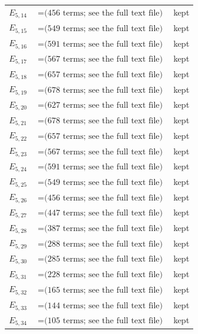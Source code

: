 \documentclass[10pt]{article}
\begin{document}
\begin{longtable}{r>{\raggedright\arraybackslash}p{}>{\raggedright\arraybackslash}p{}}
$E_{5,14}$ & $= \text{(456 terms; see the full text file)}$ & kept \\
$E_{5,15}$ & $= \text{(549 terms; see the full text file)}$ & kept \\
$E_{5,16}$ & $= \text{(591 terms; see the full text file)}$ & kept \\
$E_{5,17}$ & $= \text{(567 terms; see the full text file)}$ & kept \\
$E_{5,18}$ & $= \text{(657 terms; see the full text file)}$ & kept \\
$E_{5,19}$ & $= \text{(678 terms; see the full text file)}$ & kept \\
$E_{5,20}$ & $= \text{(627 terms; see the full text file)}$ & kept \\
$E_{5,21}$ & $= \text{(678 terms; see the full text file)}$ & kept \\
$E_{5,22}$ & $= \text{(657 terms; see the full text file)}$ & kept \\
$E_{5,23}$ & $= \text{(567 terms; see the full text file)}$ & kept \\
$E_{5,24}$ & $= \text{(591 terms; see the full text file)}$ & kept \\
$E_{5,25}$ & $= \text{(549 terms; see the full text file)}$ & kept \\
$E_{5,26}$ & $= \text{(456 terms; see the full text file)}$ & kept \\
$E_{5,27}$ & $= \text{(447 terms; see the full text file)}$ & kept \\
$E_{5,28}$ & $= \text{(387 terms; see the full text file)}$ & kept \\
$E_{5,29}$ & $= \text{(288 terms; see the full text file)}$ & kept \\
$E_{5,30}$ & $= \text{(285 terms; see the full text file)}$ & kept \\
$E_{5,31}$ & $= \text{(228 terms; see the full text file)}$ & kept \\
$E_{5,32}$ & $= \text{(165 terms; see the full text file)}$ & kept \\
$E_{5,33}$ & $= \text{(144 terms; see the full text file)}$ & kept \\
$E_{5,34}$ & $= \text{(105 terms; see the full text file)}$ & kept \\

\end{longtable}
\end{document}
